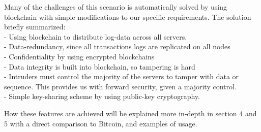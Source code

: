 Many of the challenges of this scenario is automatically solved by using blockchain with simple modifications to our specific requirements.
The solution briefly summarized:\\
- Using blockchain to distribute log-data across all servers.\\
- Data-redundancy, since all transactions logs are replicated on all nodes\\
- Confidentiality by using encrypted blockchains\\
- Data integrity is built into blockchain, so tampering is hard\\
- Intruders must control the majority of the servers to tamper with data or sequence. This provides us with forward security, given a majority control.\\
- Simple key-sharing scheme by using public-key cryptography.

How these features are achieved will be explained more in-depth in section 4 and 5 with a direct comparison to Bitcoin, and examples of usage.